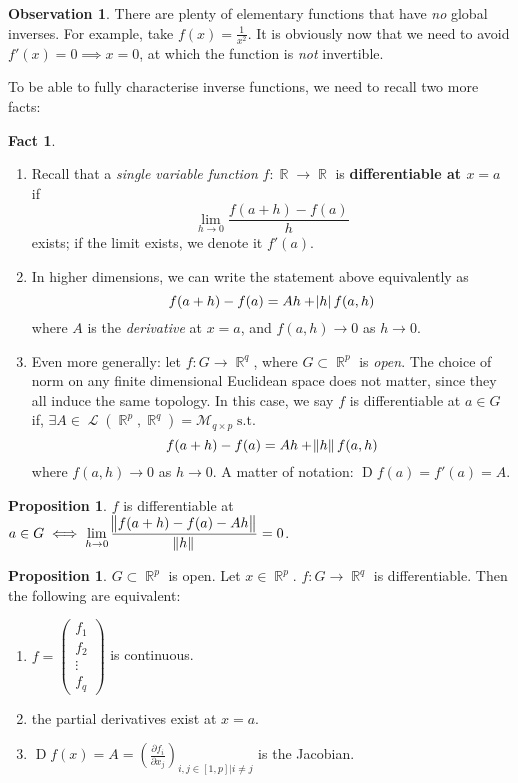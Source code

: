 \documentclass{amsart} %
\theoremstyle{mytheoremstyle}
\theoremstyle{definition}
\newtheorem{proposition}[definition]{Proposition}
\newtheorem{obs}[definition]{Observation}
\newtheorem{fact}[definition]{Fact}
\numberwithin{equation}{section}
\DeclareMathOperator{\R}{\mathbb{R}}
\DeclareMathOperator{\1}{\mathbbm{1}}
\DeclareMathOperator{\suchthat}{\text{ s.t. }}
\DeclareMathOperator{\DD}{D}
\DeclareMathOperator{\linearop}{\mathcal{L}}
\begin{document}
\begin{obs}
	There are plenty of elementary functions that have \textit{no} global inverses. For example, take $f(x) = \frac{1}{x^2}$. It is obviously now that we need to avoid $f'(x) = 0 \implies x= 0$, at which the function is \textit{not} invertible.
\end{obs}

To be able to fully characterise inverse functions, we need to recall two more facts:

\begin{fact}
	\begin{enumerate}[label=(\arabic*)]
		\item Recall that a \textit{single variable function} $f: \R \to \R$ is \textbf{differentiable at $x=a$} if
		$$\lim\limits_{h \to 0} \frac{f(a+h) - f(a)}{h} $$
		exists; if the limit exists, we denote it $f'(a)$.
		
		\item In higher dimensions, we can write the statement above equivalently as
		$$ f(a+h) - f(a) = Ah + \abs{h} f(a,h) $$
		where $A$ is the \textit{derivative} at $x=a$, and $f(a,h) \to 0 $ as $ h\to 0$.
		
		\item Even more generally: let $f : G \to \R^{q}$, where $G \subset \R^{p}$ is \textit{open}. The choice of norm on any finite dimensional Euclidean space does not matter, since they all induce the same topology. In this case, we say $f$ is differentiable at $a \in G$ if, $\exists A \in \linearop (\R^p,\R^q) = \mathcal{M}_{q \times p} \suchthat $
		$$ f(a+h) - f(a) = Ah + \norm{h} f(a,h) $$ 
		where $f(a,h) \to 0 $ as $h\to 0$. A matter of notation: $\DD f(a) = f'(a) = A$.
	\end{enumerate}
\end{fact}

\begin{proposition}
	$f$ is differentiable at $a \in G \iff \displaystyle \lim\limits_{h \to 0} \frac{\norm{ f(a+h) - f(a) - Ah } }{\norm{h} }=0$.
\end{proposition}

\begin{proposition}
	$G \subset \R^p$ is open. Let $x \in \R^p$. $f: G \to \R^q$ is differentiable. Then the following are equivalent:
	\begin{enumerate}[label=(\arabic*)]
		\item $f = \left( \begin{array}{c} f_1 \\ f_2 \\ \vdots \\ f_q \end{array} \right) $ is continuous.
		\item the partial derivatives exist at $x=a$.
		\item $\DD f(x) = A = \displaystyle \left( \frac{\partial f_i}{\partial x_j} \right)_{i,j \in [1,p] |  i \neq j}$ is the Jacobian.
	\end{enumerate}
\end{proposition}
\end{document}
